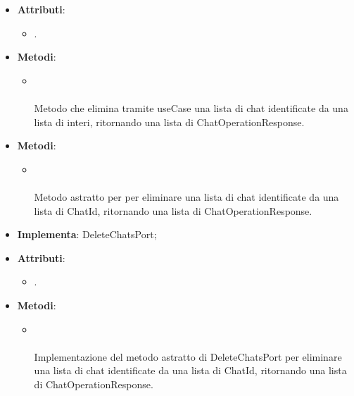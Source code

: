 \documentclass[10pt, a4paper]{article}
\begin{document}
\label{DeleteChatsControllerDettaglio}
\begin{itemize}
    \item \textbf{Attributi}:
    \begin{itemize}
        \item {}.
    \end{itemize}
    \item \textbf{Metodi}:
    \begin{itemize}
        \item {}\\ \\
        Metodo che elimina tramite useCase una lista di chat identificate da una lista di interi, ritornando una lista di ChatOperationResponse.
    \end{itemize}
\end{itemize}


\label{DeleteChatsPortDettaglio}
\begin{itemize}
    \item \textbf{Metodi}:
    \begin{itemize}
        \item {}\\ \\
        Metodo astratto per per eliminare una lista di chat identificate da una lista di ChatId, ritornando una lista di ChatOperationResponse.
    \end{itemize}
\end{itemize}


\label{DeleteChatsPostgresDettaglio}
\begin{itemize}
    \item \textbf{Implementa}: DeleteChatsPort;
    \item \textbf{Attributi}:
    \begin{itemize}
        \item {}.
    \end{itemize}
    \item \textbf{Metodi}:
    \begin{itemize}
        \item {}\\ \\
        Implementazione del metodo astratto di DeleteChatsPort per eliminare una lista di chat identificate da una lista di ChatId, ritornando una lista di ChatOperationResponse.
    \end{itemize}
\end{itemize}
\end{document}
